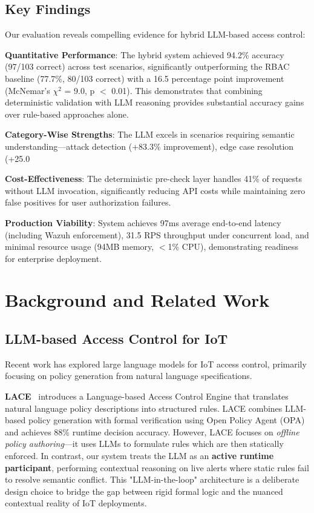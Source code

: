 \documentclass[conference]{IEEEtran}
\begin{document}
\subsection{Key Findings}

Our evaluation reveals compelling evidence for hybrid LLM-based access control:

\textbf{Quantitative Performance}: The hybrid system achieved 94.2\% accuracy (97/103 correct) across test scenarios, significantly outperforming the RBAC baseline (77.7\%, 80/103 correct) with a 16.5 percentage point improvement (McNemar's $\chi^2$ = 9.0, p $<$ 0.01). This demonstrates that combining deterministic validation with LLM reasoning provides substantial accuracy gains over rule-based approaches alone.

\textbf{Category-Wise Strengths}: The LLM excels in scenarios requiring semantic understanding—attack detection (+83.3\% improvement), edge case resolution (+25.0%

\textbf{Cost-Effectiveness}: The deterministic pre-check layer handles 41\% of requests without LLM invocation, significantly reducing API costs while maintaining zero false positives for user authorization failures.

\textbf{Production Viability}: System achieves 97ms average end-to-end latency (including Wazuh enforcement), 31.5 RPS throughput under concurrent load, and minimal resource usage (94MB memory, $<$1\% CPU), demonstrating readiness for enterprise deployment.

\section{Background and Related Work}

\subsection{LLM-based Access Control for IoT}

Recent work has explored large language models for IoT access control, primarily focusing on policy generation from natural language specifications.

\textbf{LACE}~\cite{lace2025} introduces a Language-based Access Control Engine that translates natural language policy descriptions into structured rules. LACE combines LLM-based policy generation with formal verification using Open Policy Agent (OPA) and achieves 88\% runtime decision accuracy. However, LACE focuses on \textit{offline policy authoring}—it uses LLMs to formulate rules which are then statically enforced. In contrast, our system treats the LLM as an \textbf{active runtime participant}, performing contextual reasoning on live alerts where static rules fail to resolve semantic conflict. This "LLM-in-the-loop" architecture is a deliberate design choice to bridge the gap between rigid formal logic and the nuanced contextual reality of IoT deployments.
\end{document}

